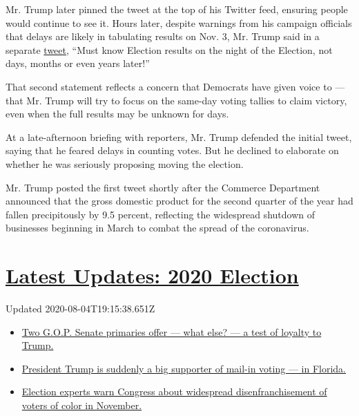 Mr. Trump later pinned the tweet at the top of his Twitter feed,
ensuring people would continue to see it. Hours later, despite warnings
from his campaign officials that delays are likely in tabulating results
on Nov. 3, Mr. Trump said in a separate
\href{https://twitter.com/realDonaldTrump/status/1288933078287745024?s=20}{tweet},
``Must know Election results on the night of the Election, not days,
months or even years later!''

That second statement reflects a concern that Democrats have given voice
to --- that Mr. Trump will try to focus on the same-day voting tallies
to claim victory, even when the full results may be unknown for days.

At a late-afternoon briefing with reporters, Mr. Trump defended the
initial tweet, saying that he feared delays in counting votes. But he
declined to elaborate on whether he was seriously proposing moving the
election.

Mr. Trump posted the first tweet shortly after the Commerce Department
announced that the gross domestic product for the second quarter of the
year had fallen precipitously by 9.5 percent, reflecting the widespread
shutdown of businesses beginning in March to combat the spread of the
coronavirus.

\hypertarget{latest-updates-2020-election}{%
\section{\texorpdfstring{\href{https://www.nytimes.com/2020/08/04/us/elections/primary-election-michigan-arizona-kansas.html?action=click\&pgtype=Article\&state=default\&region=MAIN_CONTENT_1\&context=storylines_live_updates}{Latest
Updates: 2020
Election}}{Latest Updates: 2020 Election}}\label{latest-updates-2020-election}}

Updated 2020-08-04T19:15:38.651Z

\begin{itemize}
\tightlist
\item
  \href{https://www.nytimes.com/2020/08/04/us/elections/primary-election-michigan-arizona-kansas.html?action=click\&pgtype=Article\&state=default\&region=MAIN_CONTENT_1\&context=storylines_live_updates\#link-3924dd44}{Two
  G.O.P. Senate primaries offer --- what else? --- a test of loyalty to
  Trump.}
\item
  \href{https://www.nytimes.com/2020/08/04/us/elections/primary-election-michigan-arizona-kansas.html?action=click\&pgtype=Article\&state=default\&region=MAIN_CONTENT_1\&context=storylines_live_updates\#link-32b39e33}{President
  Trump is suddenly a big supporter of mail-in voting --- in Florida.}
\item
  \href{https://www.nytimes.com/2020/08/04/us/elections/primary-election-michigan-arizona-kansas.html?action=click\&pgtype=Article\&state=default\&region=MAIN_CONTENT_1\&context=storylines_live_updates\#link-6d019753}{Election
  experts warn Congress about widespread disenfranchisement of voters of
  color in November.}
\end{itemize}

